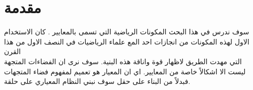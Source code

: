 \chapter*{مقدمة}


\begin{doublespacing}
	سوف ندرس في هذا البحث المكونات الرياضية التي تسمى بالمعايير . كان الاستخدام الاول لهذه المكونات من انجازات احد المع علماء الرياضيات في النصف الاول من هذا القرن\\ \noindent
	  التي مهدت الطريق لاظهار قوة واناقة هذه البنية. سوف نرى ان الفضاءات المتجهة ليست الا اشكالاً خاصة من المعايير. اي ان المعيار هو تعميم لمفهوم فضاء المتجهات فبدلاً من البناء على حقل سوف نبني النظام المعياري على حلقة. 
\end{doublespacing}




